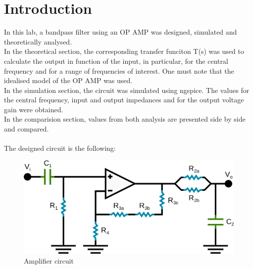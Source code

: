 \section{Introduction}
\label{sec:intro}
In this lab, a bandpass filter using an OP AMP was designed, simulated and theoretically analysed.\\
 In the theoretical section, the corresponding transfer funciton T(s) was used to calculate the output in function of the input, in particular, for the central frequency and for a range of frequencies of interest. One must note that the idealised model of the OP AMP was used. \\
 In the simulation section, the circuit was simulated using ngspice. The values for the central frequency, input and output impedances and for the output voltage gain were obtained.\\
In the comparision section, values from both analysis are presented side by side and compared.\\ \\
The designed circuit is the following:

\begin{figure} [!htb] 
  \includegraphics[width=\linewidth]{circuit.png}
  \vspace{1cm}
  \caption{Amplifier circuit}
  \label{fig:circuit}
  \hfill
\end{figure}


\FloatBarrier
